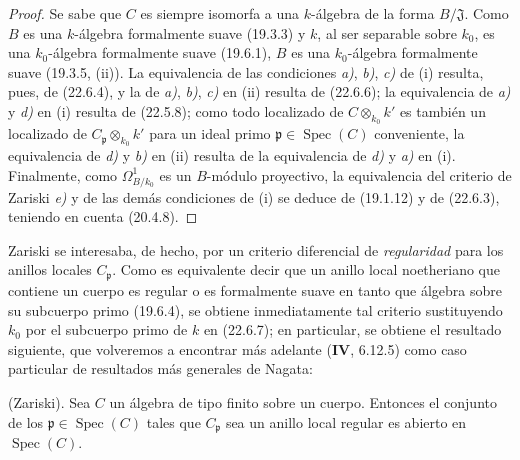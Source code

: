 \begin{proof}
Se sabe que $C$ es siempre isomorfa a una $k$-álgebra de la forma
$B/\mathfrak J$. Como $B$ es una $k$-álgebra formalmente suave (19.3.3) y
$k$, al ser separable sobre $k_0$, es una $k_0$-álgebra formalmente suave
(19.6.1), $B$ es una $k_0$-álgebra formalmente suave (19.3.5, (ii)).
La equivalencia de las condiciones \emph{a)}, \emph{b)}, \emph{c)} de (i) resulta, pues, de (22.6.4), y
la de \emph{a)}, \emph{b)}, \emph{c)} en (ii) resulta de (22.6.6); la equivalencia de \emph{a)} y \emph{d)}
en (i) resulta de (22.5.8); como todo localizado de $C\otimes_{k_0}k'$ es
también un localizado de $C_{\mathfrak p}\otimes_{k_0}k'$ para un ideal primo
$\mathfrak p\in\operatorname{Spec}(C)$ conveniente, la equivalencia de \emph{d)} y \emph{b)} en (ii)
resulta de la equivalencia de \emph{d)} y \emph{a)} en (i). Finalmente, como
$\Omega^1_{B/k_0}$ es un $B$-módulo proyectivo, la equivalencia del criterio de
Zariski \emph{e)} y de las demás condiciones de (i) se deduce de (19.1.12) y de
(22.6.3), teniendo en cuenta (20.4.8).
\end{proof}

Zariski se interesaba, de hecho, por un criterio diferencial de \emph{regularidad} para los
anillos locales $C_{\mathfrak p}$. Como es equivalente decir que un anillo
local noetheriano que contiene un cuerpo es regular o es formalmente suave en
tanto que álgebra sobre su subcuerpo primo (19.6.4), se obtiene inmediatamente tal
criterio sustituyendo $k_0$ por el subcuerpo primo de $k$ en (22.6.7); en
particular, se obtiene el resultado siguiente, que volveremos a encontrar más adelante
(\textbf{IV}, 6.12.5) como caso particular de resultados más generales de Nagata:

\begin{corollary}[22.6.8]
\label{0.22.6.8-fr}
\textnormal{(Zariski).}
Sea $C$ un álgebra de tipo finito sobre un cuerpo. Entonces el conjunto de los
$\mathfrak p\in\operatorname{Spec}(C)$ tales que $C_{\mathfrak p}$ sea un anillo local
regular es \textup{abierto} en $\operatorname{Spec}(C)$.
\end{corollary}

